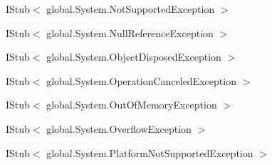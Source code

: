 \begin{DoxyCompactList}
\begin{DoxyCompactList}
\end{DoxyCompactList}
\item I\-Stub$<$ global.\-System.\-Not\-Supported\-Exception $>$\begin{DoxyCompactList}
\item {}
\end{DoxyCompactList}
\item I\-Stub$<$ global.\-System.\-Null\-Reference\-Exception $>$\begin{DoxyCompactList}
\item {}
\end{DoxyCompactList}
\item I\-Stub$<$ global.\-System.\-Object\-Disposed\-Exception $>$\begin{DoxyCompactList}
\item {}
\end{DoxyCompactList}
\item I\-Stub$<$ global.\-System.\-Operation\-Canceled\-Exception $>$\begin{DoxyCompactList}
\item {}
\end{DoxyCompactList}
\item I\-Stub$<$ global.\-System.\-Out\-Of\-Memory\-Exception $>$\begin{DoxyCompactList}
\item {}
\end{DoxyCompactList}
\item I\-Stub$<$ global.\-System.\-Overflow\-Exception $>$\begin{DoxyCompactList}
\item {}
\end{DoxyCompactList}
\item I\-Stub$<$ global.\-System.\-Platform\-Not\-Supported\-Exception $>$\begin{DoxyCompactList}

\end{DoxyCompactList}
\end{DoxyCompactList}
